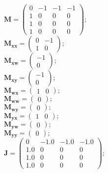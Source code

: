 \documentclass[11pt, oneside]{article}      %
\begin{document}
%
$ \mathbf{M} = \left(\begin{array}{cccc}0 & -1 & -1 & -1\\1 & 0 & 0 & 0\\1 & 0 & 0 & 0\\1 & 0 & 0 & 0\end{array}\right) ; $ 
%
\\
%
$ \mathbf{M_{xx}} = \left(\begin{array}{cc}0 & -1\\1 & 0\end{array}\right) ; $ 
%
\\
%
$ \mathbf{M_{xw}} = \left(\begin{array}{c}-1\\0\end{array}\right) ; $ 
%
\\
%
$ \mathbf{M_{xy}} = \left(\begin{array}{c}-1\\0\end{array}\right) ; $ 
%
\\
%
$ \mathbf{M_{wx}} = \left(\begin{array}{cc}1 & 0\end{array}\right) ; $ 
%
\\
%
$ \mathbf{M_{ww}} = \left(\begin{array}{c}0\end{array}\right) ; $ 
%
\\
%
$ \mathbf{M_{wy}} = \left(\begin{array}{c}0\end{array}\right) ; $ 
%
\\
%
$ \mathbf{M_{yx}} = \left(\begin{array}{cc}1 & 0\end{array}\right) ; $ 
%
\\
%
$ \mathbf{M_{yw}} = \left(\begin{array}{c}0\end{array}\right) ; $ 
%
\\
%
$ \mathbf{M_{yy}} = \left(\begin{array}{c}0\end{array}\right) ; $ 
%
\\
%
$ \mathbf{J} = \left(\begin{array}{cccc}0 & -1.0 & -1.0 & -1.0\\1.0 & 0 & 0 & 0\\1.0 & 0 & 0 & 0\\1.0 & 0 & 0 & 0\end{array}\right) ; $ 
\end{document}
